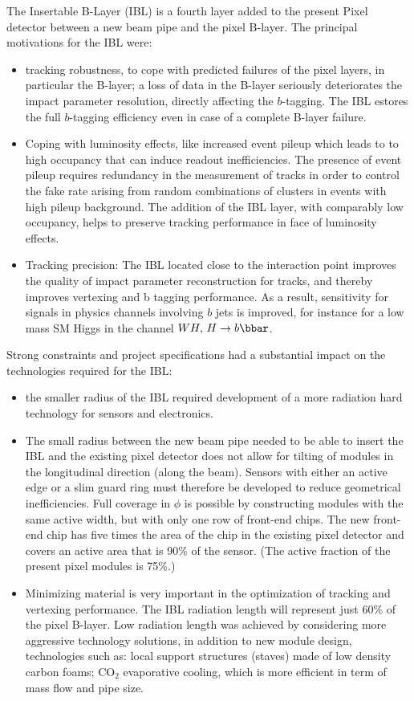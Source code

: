 The Insertable B-Layer (IBL) is a fourth layer added to the present Pixel detector between a
new beam pipe and the pixel B-layer. The principal motivations for the IBL were:

\begin{itemize}
\item tracking robustness, to cope with predicted failures of the pixel layers, in particular the B-layer; 
  a loss of data in the B-layer
seriously deteriorates the impact parameter resolution, directly affecting the $b$-tagging. The
IBL estores the full $b$-tagging efficiency even in case of a complete B-layer failure.
  \item Coping with luminosity effects, like increased event pileup which leads to to high occupancy that can induce readout inefficiencies. The presence of event pileup requires redundancy in
the measurement of tracks in order to control the fake rate arising from random combinations
of clusters in events with high pileup background. The addition of the IBL layer, with
comparably low occupancy, helps to preserve tracking performance in face of luminosity
effects.
  \item Tracking precision: The IBL located close to the interaction point improves the quality of
impact parameter reconstruction for tracks, and thereby improves vertexing and b tagging
performance. As a result, sensitivity for signals in physics channels involving $b$ jets is improved,
for instance for a low mass SM Higgs in the channel $WH,\,H\to b\bbar$.
\end{itemize}

Strong constraints and project specifications had a substantial impact on the technologies
required for the IBL:

\begin{itemize}
\item the smaller radius of the IBL required development of a more radiation hard technology for
sensors and electronics.
\item The small radius between the new beam pipe needed to be able to insert the IBL
 and the existing pixel detector does not allow
for tilting of modules in the longitudinal direction (along the beam). Sensors with either
an active edge or a slim guard ring must therefore be developed to reduce geometrical inefficiencies.
Full coverage in $\phi$ is possible by constructing modules with the same active
width, but with only one row of front-end chips. The new front-end chip has five times the
area of the chip in the existing pixel detector and covers an active area that is 90\% of the
sensor. (The active fraction of the present pixel modules is 75\%.)
 \item Minimizing material is very important in the optimization of tracking and vertexing performance.
The IBL radiation length will represent just 60\% of the pixel B-layer. Low
radiation length was achieved by considering more aggressive technology solutions, in addition
to new module design, technologies such as: local support structures (staves) made of low
density carbon foams; CO$_2$ evaporative cooling, which is more efficient in term of mass flow
and pipe size.
\end{itemize}

